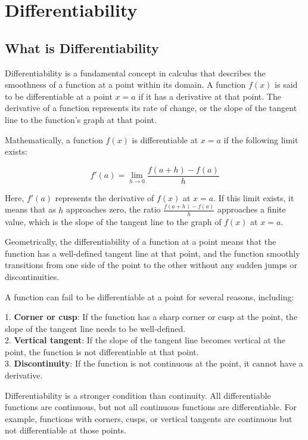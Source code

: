 \chapter{Differentiability}


\section{What is Differentiability}

Differentiability is a fundamental concept in calculus that describes the smoothness of a function at a point within its domain. A function \( f(x) \) is said to be differentiable at a point \( x = a \) if it has a derivative at that point. The derivative of a function represents its rate of change, or the slope of the tangent line to the function's graph at that point.

Mathematically, a function \( f(x) \) is differentiable at \( x = a \) if the following limit exists:

\[ f'(a) = \lim_{h \to 0} \frac{f(a + h) - f(a)}{h} \]

Here, \( f'(a) \) represents the derivative of \( f(x) \) at \( x = a \). If this limit exists, it means that as \( h \) approaches zero, the ratio \( \frac{f(a + h) - f(a)}{h} \) approaches a finite value, which is the slope of the tangent line to the graph of \( f(x) \) at \( x = a \).

Geometrically, the differentiability of a function at a point means that the function has a well-defined tangent line at that point, and the function smoothly transitions from one side of the point to the other without any sudden jumps or discontinuities.

A function can fail to be differentiable at a point for several reasons, including:

1. \textbf{Corner or cusp}: If the function has a sharp corner or cusp at the point, the slope of the tangent line needs to be well-defined.\\
2. \textbf{Vertical tangent}: If the slope of the tangent line becomes vertical at the point, the function is not differentiable at that point.\\
3. \textbf{Discontinuity}: If the function is not continuous at the point, it cannot have a derivative.

Differentiability is a stronger condition than continuity. All differentiable functions are continuous, but not all continuous functions are differentiable. For example, functions with corners, cusps, or vertical tangents are continuous but not differentiable at those points.

